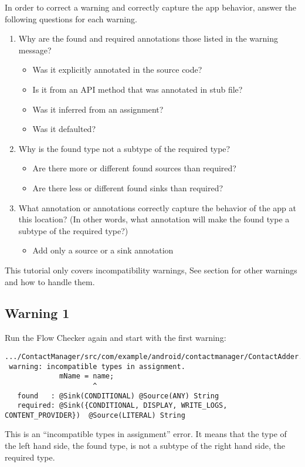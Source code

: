 In order to correct a warning and correctly capture the app behavior, answer 
the following questions for each warning.
\begin{enumerate}
\item Why are the found and required annotations those listed in the warning message?
   \begin{itemize}
    \item Was it explicitly annotated in the source code? 
    \item Is it from an API method that was annotated in stub file? 
    \item Was it inferred from an assignment? 
    \item Was it defaulted? 
    \end{itemize}
\item Why is the found type not a subtype of the required type? 
  \begin{itemize}
   \item Are there more or different found sources than required?
   \item Are there less or different found sinks than required? 
   \end{itemize}
\item What annotation or annotations correctly capture the behavior of the app at
  this location? (In other words, what annotation will make the found type a 
  subtype of the required type?)
   \begin{itemize}
   \item Add only a source or a sink annotation
   \end{itemize}
\end{enumerate}

This tutorial only covers incompatibility warnings, See section  for 
other warnings and how to handle them.

\subsection{Warning 1}
Run the Flow Checker again and start with the first warning:

\begin{Verbatim}  
.../ContactManager/src/com/example/android/contactmanager/ContactAdder.java:309:
 warning: incompatible types in assignment.
             mName = name;
                     ^
   found   : @Sink(CONDITIONAL) @Source(ANY) String
   required: @Sink({CONDITIONAL, DISPLAY, WRITE_LOGS, CONTENT_PROVIDER})  @Source(LITERAL) String
\end{Verbatim}
This is an ``incompatible types in assignment'' error.  It means that the type
of the left hand side, the found type, is not a subtype of the right hand side,
the required type.
 
